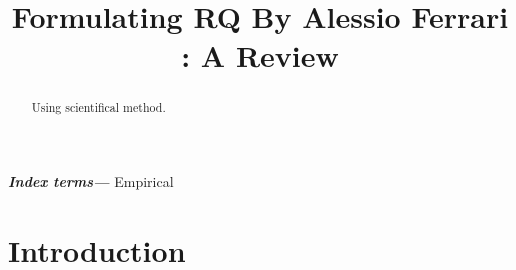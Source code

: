 \documentclass[conference, compsoc, twoside]{IEEEtran}
\begin{document}
\preto\tabular{\setcounter{magicrownumbers}{0}}
\newcommand\rownumber{\stepcounter{magicrownumbers}\arabic{magicrownumbers}}
\title{\Huge Formulating RQ By Alessio Ferrari : A Review}
\author{
}

\maketitle
\providecommand{\keywords}[1]{\textbf{\textit{Index terms---}} #1}
\begin{abstract}
Using scientifical method.
\end{abstract}

\keywords{Empirical}
\IEEEpeerreviewmaketitle

\section{Introduction}
\end{document}
